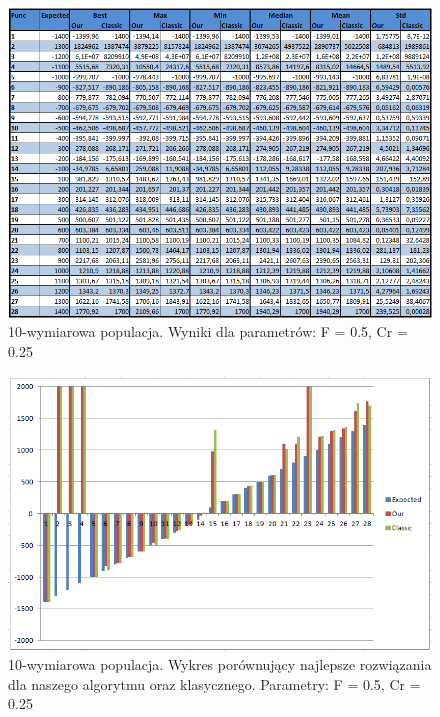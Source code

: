 \documentclass[a4paper]{article}
\begin{document}
\begin{figure}
\centering
\includegraphics[width=\textwidth]{F5Cr25L10tab.png}
\caption{10-wymiarowa populacja. Wyniki dla parametrów: F = 0.5, Cr = 0.25}
\end{figure}

\begin{figure}
\centering
\includegraphics[width=\textwidth]{F5Cr25L10chart.png}
\caption{10-wymiarowa populacja. Wykres porównujący najlepsze rozwiązania dla naszego algorytmu oraz klasycznego. Parametry: F = 0.5, Cr = 0.25}
\end{figure}
\end{document}
